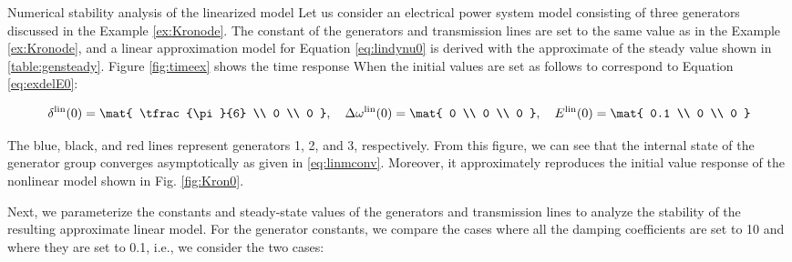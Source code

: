 \documentclass[graybox, envcountchap]{svmult}
\begin{document}



\begin{example}{Numerical stability analysis of the linearized model}\label{ex:linsyssim}
Let us consider an electrical power system model consisting of three generators
discussed in the Example \ref{ex:Kronode}. The constant of the generators and
transmission lines are set to the same value as in the Example \ref{ex:Kronode},
and a linear approximation model for Equation \ref{eq:lindynu0} is derived with
the approximate of the steady value shown in \ref{table:gensteady}. Figure
\ref{fig:timeex} shows the time response When the initial values are set as
follows to correspond to Equation \ref{eq:exdelE0}:

\begin{equation}\label{eq:linmini}
  \delta^{\rm lin}(0)
  =
  \mat{
    \tfrac{\pi}{6} \\
    0 \\
    0
  },\quad
  \Delta \omega^{\rm lin}(0)
  =
  \mat{
    0 \\
    0 \\
    0
  },\quad
  E^{\rm lin}(0)
  =
  \mat{
    0.1 \\
    0 \\
    0
  }
\end{equation}

The blue, black, and red lines represent generators 1, 2, and 3, respectively.
From this figure, we can see that the internal state of the generator group
converges asymptotically as given in \eqref{eq:linmconv}.  Moreover, it
approximately reproduces the initial value response of the nonlinear model shown
in Fig. \ref{fig:Kron0}.

Next, we parameterize the constants and steady-state values of the generators
and transmission lines to analyze the stability of the resulting approximate
linear model. For the generator constants, we compare the cases where all the
damping coefficients are set to 10 and where they are set to 0.1, i.e., we
consider the two cases:


\end{example}
\end{document}
